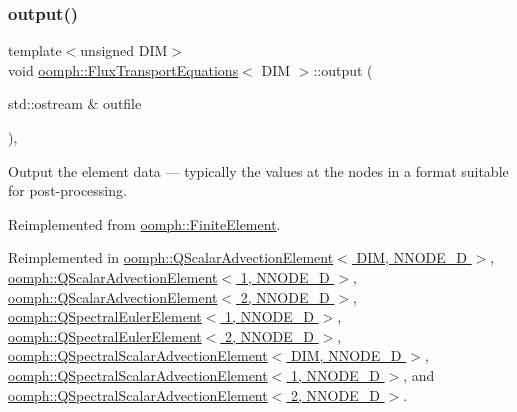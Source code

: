\subsubsection{\texorpdfstring{output()}{output()}\hspace{0.1cm}{\footnotesize\ttfamily [1/2]}}
{\footnotesize\ttfamily template$<$unsigned D\+IM$>$ \\
void \hyperlink{classoomph_1_1FluxTransportEquations}{oomph\+::\+Flux\+Transport\+Equations}$<$ D\+IM $>$\+::output (\begin{DoxyParamCaption}\item[{std\+::ostream \&}]{outfile }\end{DoxyParamCaption})\hspace{0.3cm}{\ttfamily [inline]}, {\ttfamily [virtual]}}



Output the element data --- typically the values at the nodes in a format suitable for post-\/processing. 



Reimplemented from \hyperlink{classoomph_1_1FiniteElement_a2ad98a3d2ef4999f1bef62c0ff13f2a7}{oomph\+::\+Finite\+Element}.



Reimplemented in \hyperlink{classoomph_1_1QScalarAdvectionElement_aeb9bb432fb1662b65e05ffd5a2ac8693}{oomph\+::\+Q\+Scalar\+Advection\+Element$<$ D\+I\+M, N\+N\+O\+D\+E\+\_\+D $>$}, \hyperlink{classoomph_1_1QScalarAdvectionElement_aeb9bb432fb1662b65e05ffd5a2ac8693}{oomph\+::\+Q\+Scalar\+Advection\+Element$<$ 1, N\+N\+O\+D\+E\+\_\+D $>$}, \hyperlink{classoomph_1_1QScalarAdvectionElement_aeb9bb432fb1662b65e05ffd5a2ac8693}{oomph\+::\+Q\+Scalar\+Advection\+Element$<$ 2, N\+N\+O\+D\+E\+\_\+D $>$}, \hyperlink{classoomph_1_1QSpectralEulerElement_ae3771a5f57f21d3a97595856b089e467}{oomph\+::\+Q\+Spectral\+Euler\+Element$<$ 1, N\+N\+O\+D\+E\+\_\+D $>$}, \hyperlink{classoomph_1_1QSpectralEulerElement_ae3771a5f57f21d3a97595856b089e467}{oomph\+::\+Q\+Spectral\+Euler\+Element$<$ 2, N\+N\+O\+D\+E\+\_\+D $>$}, \hyperlink{classoomph_1_1QSpectralScalarAdvectionElement_ad594e0a382ee5e10e50cedf75215f40e}{oomph\+::\+Q\+Spectral\+Scalar\+Advection\+Element$<$ D\+I\+M, N\+N\+O\+D\+E\+\_\+D $>$}, \hyperlink{classoomph_1_1QSpectralScalarAdvectionElement_ad594e0a382ee5e10e50cedf75215f40e}{oomph\+::\+Q\+Spectral\+Scalar\+Advection\+Element$<$ 1, N\+N\+O\+D\+E\+\_\+D $>$}, and \hyperlink{classoomph_1_1QSpectralScalarAdvectionElement_ad594e0a382ee5e10e50cedf75215f40e}{oomph\+::\+Q\+Spectral\+Scalar\+Advection\+Element$<$ 2, N\+N\+O\+D\+E\+\_\+D $>$}.



